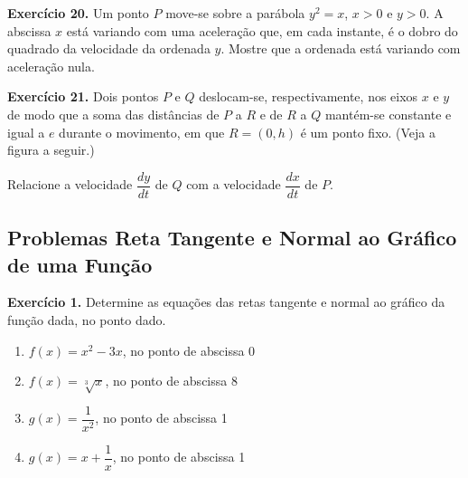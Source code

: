 \documentclass[12pt,a4paper]{article}
\begin{document}
\vspace{0.5cm}
\noindent\textbf{Exercício 20.}
Um ponto $P$ move-se sobre a parábola $y^2 = x$, $x > 0$ e $y > 0$. A abscissa $x$ está variando com uma aceleração que, em cada instante, é o dobro do quadrado da velocidade da ordenada $y$. Mostre que a ordenada está variando com aceleração nula.

\vspace{0.5cm}
\noindent\textbf{Exercício 21.}
Dois pontos $P$ e $Q$ deslocam-se, respectivamente, nos eixos $x$ e $y$ de modo que a soma das distâncias de $P$ a $R$ e de $R$ a $Q$ mantém-se constante e igual a $e$ durante o movimento, em que $R = (0, h)$ é um ponto fixo. (Veja a figura a seguir.)

\begin{center}
\end{center}

\noindent Relacione a velocidade $\dfrac{dy}{dt}$ de $Q$ com a velocidade $\dfrac{dx}{dt}$ de $P$.

\subsection{Problemas Reta Tangente e Normal ao Gráfico de uma Função}
\vspace{0.5cm}
\noindent\textbf{Exercício 1.} Determine as equações das retas tangente e normal ao gráfico da função dada, no ponto dado.
\begin{enumerate}
    \renewcommand{\theenumi}{\alph{enumi}}
    \renewcommand{\labelenumi}{\theenumi)}
    \item $f(x) = x^2 - 3x$, no ponto de abscissa 0
    \item $f(x) = \sqrt[3]{x}$, no ponto de abscissa 8
    \item $g(x) = \dfrac{1}{x^2}$, no ponto de abscissa 1
    \item $g(x) = x + \dfrac{1}{x}$, no ponto de abscissa 1
\end{enumerate}
\end{document}
